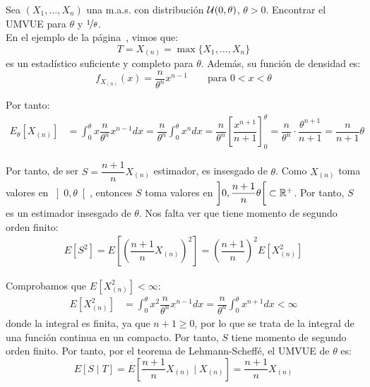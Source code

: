\begin{ejemplo}
    Sea $(X_1, \ldots, X_n)$ una m.a.s. con distribución $\mathcal{U}(0, \theta)$, $\theta > 0$. Encontrar el UMVUE para $\theta$ y $\nicefrac{1}{\theta}$.\\

    En el ejemplo de la página~\pageref{ejemplo:suficiencia-completitud-Uniforme}, vimos que:
    \begin{equation*}
        T = X_{(n)} = \max\{X_1, \ldots, X_n\}
    \end{equation*}
    es un estadístico suficiente y completo para $\theta$. Además, su función de densidad es:
    \begin{equation*}
        f_{X_{(n)}}(x) = \dfrac{n}{\theta^n} x^{n-1}\qquad \text{para } 0 < x < \theta
    \end{equation*}

    Por tanto:
    \begin{align*}
        E_\theta[X_{(n)}] &= \int_0^\theta x \dfrac{n}{\theta^n} x^{n-1} dx = \dfrac{n}{\theta^n} \int_0^\theta x^n dx = \dfrac{n}{\theta^n} \left[\dfrac{x^{n+1}}{n+1}\right]_0^\theta = \dfrac{n}{\theta^n} \cdot \dfrac{\theta^{n+1}}{n+1} = \dfrac{n}{n+1} \theta
    \end{align*}

    Por tanto, de ser $S = \dfrac{n+1}{n} X_{(n)}$ estimador, es insesgado de $\theta$. Como $X_{(n)}$ toma valores en $\left]0, \theta\right[$, entonces $S$ toma valores en $\left]0, \dfrac{n+1}{n}\theta\right[\subset \mathbb{R}^+$. Por tanto, $S$ es un estimador insesgado de $\theta$. Nos falta ver que tiene momento de segundo orden finito:
    \begin{align*}
        E[S^2] = E\left[\left(\dfrac{n+1}{n} X_{(n)}\right)^2\right] = \left(\dfrac{n+1}{n}\right)^2 E[X_{(n)}^2]
    \end{align*}

    Comprobamos que $E[X_{(n)}^2] < \infty$:
    \begin{align*}
        E[X_{(n)}^2] &= \int_0^\theta x^2 \dfrac{n}{\theta^n} x^{n-1} dx = \dfrac{n}{\theta^n} \int_0^\theta x^{n+1} dx<\infty
    \end{align*}
    donde la integral es finita, ya que $n+1\geq 0$, por lo que se trata de la integral de una función continua en un compacto. Por tanto, $S$ tiene momento de segundo orden finito. Por tanto, por el teorema de Lehmann-Scheffé, el UMVUE de $\theta$ es:
    \begin{equation*}
        E[S \mid T] = E\left[\dfrac{n+1}{n} X_{(n)} \mid X_{(n)}\right] = \dfrac{n+1}{n} X_{(n)}
    \end{equation*}~\\


\end{ejemplo}
